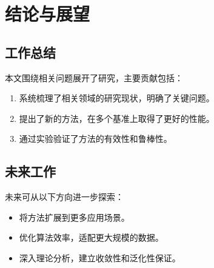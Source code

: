 %
%
%

\chapter{结论与展望}
\label{chap:conclusion}

\section{工作总结}

本文围绕相关问题展开了研究，主要贡献包括：

\begin{enumerate}
\item 系统梳理了相关领域的研究现状，明确了关键问题。
\item 提出了新的方法，在多个基准上取得了更好的性能。
\item 通过实验验证了方法的有效性和鲁棒性。
\end{enumerate}

\section{未来工作}

未来可从以下方向进一步探索：

\begin{itemize}
\item 将方法扩展到更多应用场景。
\item 优化算法效率，适配更大规模的数据。
\item 深入理论分析，建立收敛性和泛化性保证。
\end{itemize}
